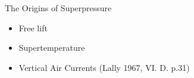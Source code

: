 \documentclass{beamer}
\begin{document}
\begin{frame}{The Origins of Superpressure}


  \begin{itemize}
  \item Free lift
  \item Supertemperature
  \item Vertical Air Currents (Lally 1967, VI. D. p.31)
  \end{itemize}

\end{frame}
\end{document}
